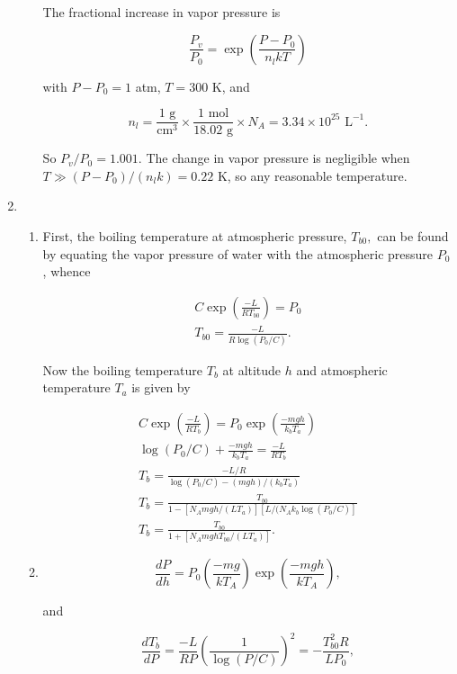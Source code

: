 \documentclass{article}
\begin{document}
\begin{enumerate}
\begin{enumerate}
		The fractional increase in vapor pressure is

		$$\frac{P_v}{P_0} = \exp \left( \frac{P - P_0}{n_l k T} \right)$$

		with $P - P_0 = 1$ atm, $T = 300$ K, and 

		$$n_l = \frac{1 \text{ g}}{\text{cm}^3} \times \frac{1 \text{ mol}}{18.02 \text{ g}} \times N_A = 3.34 \times 10^{25} \text{ L}^{-1}.$$

		So $P_v / P_0 = 1.001$. The change in vapor pressure is negligible when $T \gg (P - P_0)/(n_l k) = 0.22$ K, so any reasonable temperature.

	\end{enumerate}

	\item

	\begin{enumerate}

		\item

		First, the boiling temperature at atmospheric pressure, $T_{b0},$ can be found by equating the vapor pressure of water with the atmospheric pressure $P_0$, whence

		\begin{gather*}
		C \exp\left(\frac{-L}{RT_{b0}} \right) = P_0 \\
		T_{b0} = \frac{-L}{R\log(P_0/C)}.
		\end{gather*}

		Now the boiling temperature $T_b$ at altitude $h$ and atmospheric temperature $T_a$ is given by

		\begin{gather*}
		C \exp\left(\frac{-L}{RT_{b}} \right) = P_0 \exp \left( \frac{-mgh}{k_bT_a} \right) \\
		\log(P_0/C) + \frac{-mgh}{k_bT_a} = \frac{-L}{RT_b} \\
		T_b = \frac{-L/R}{\log(P_0/C) - (mgh)/(k_bT_a)} \\
		T_b = \frac{T_{b0}}{1 - [N_A mgh/(L T_a)][L / (N_A k_b \log(P_0/C)]} \\
		T_b = \frac{T_{b0}}{1 + [N_A mgh T_{b0}/(L T_a)]}.
		\end{gather*}

		\item

		$$\frac{dP}{dh} = P_0 \left( \frac{-mg}{kT_A} \right) \exp \left( \frac{-mgh}{kT_A} \right),$$

		and

		$$\frac{dT_b}{dP} = \frac{-L}{RP} \left( \frac{1}{\log(P/C)} \right)^2 = - \frac{T_{b0}^2 R}{LP_0},$$


\end{enumerate}
\end{enumerate}
\end{document}
